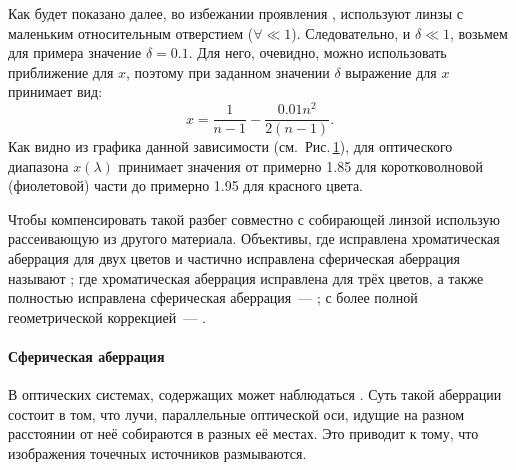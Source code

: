 \begin{figure}
	\centering
	\vspace{-1pc}
	\caption{}
	\label{pic:crown-dispersion-x}
\end{figure}
Как будет показано далее, во избежании проявления , используют линзы с маленьким относительным отверстием ($\forall \ll 1$). Следовательно, и $\delta \ll 1$, возьмем для примера значение $\delta = 0.1$. Для него, очевидно, можно использовать приближение для $x$, поэтому при заданном значении $\delta$ выражение для $x$ принимает вид:
\begin{equation*}
	x = \frac{1}{n-1} - \frac{0.01 n^2}{2(n-1)}.
\end{equation*}
Как видно из графика данной зависимости (см.~Рис.\,\ref{pic:crown-dispersion-x}), для оптического диапазона $x(\lambda)$ принимает значения от примерно 1.85 для коротковолновой (фиолетовой) части до примерно 1.95 для красного цвета.

Чтобы компенсировать такой разбег совместно с собирающей линзой использую рассеивающую из другого материала. Объективы, где исправлена хроматическая аберрация для двух цветов и частично исправлена сферическая аберрация называют ; где хроматическая аберрация исправлена для трёх цветов, а также полностью исправлена сферическая аберрация~--- ; с более полной геометрической коррекцией~--- .

\paragraph{Сферическая аберрация}
В оптических системах, содержащих  может наблюдаться . Суть такой аберрации состоит в том, что лучи, параллельные оптической оси, идущие на разном расстоянии от неё собираются в разных её местах. Это приводит к тому, что изображения точечных источников размываются.


